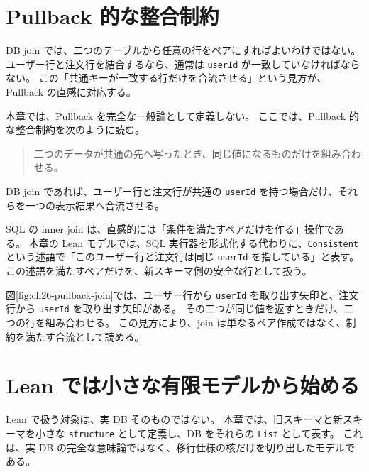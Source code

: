 \section{Pullback 的な整合制約}

DB join では、二つのテーブルから任意の行をペアにすればよいわけではない。
ユーザー行と注文行を結合するなら、通常は \texttt{userId} が一致していなければならない。
この「共通キーが一致する行だけを合流させる」という見方が、Pullback の直感に対応する。

\begin{definitionbox}
本章では、Pullback を完全な一般論として定義しない。
ここでは、Pullback 的な整合制約を次のように読む。
\begin{quote}
二つのデータが共通の先へ写ったとき、同じ値になるものだけを組み合わせる。
\end{quote}
DB join であれば、ユーザー行と注文行が共通の \texttt{userId} を持つ場合だけ、それらを一つの表示結果へ合流させる。
\end{definitionbox}

\begin{softwarebox}
SQL の inner join は、直感的には「条件を満たすペアだけを作る」操作である。
本章の Lean モデルでは、SQL 実行器を形式化する代わりに、\texttt{Consistent} という述語で「このユーザー行と注文行は同じ \texttt{userId} を指している」と表す。
この述語を満たすペアだけを、新スキーマ側の安全な行として扱う。
\end{softwarebox}


図\ref{fig:ch26-pullback-join}では、ユーザー行から \texttt{userId} を取り出す矢印と、注文行から \texttt{userId} を取り出す矢印がある。
その二つが同じ値を返すときだけ、二つの行を組み合わせる。
この見方により、join は単なるペア作成ではなく、制約を満たす合流として読める。

\section{Lean では小さな有限モデルから始める}

\begin{leanbox}
Lean で扱う対象は、実 DB そのものではない。
本章では、旧スキーマと新スキーマを小さな \texttt{structure} として定義し、DB をそれらの \texttt{List} として表す。
これは、実 DB の完全な意味論ではなく、移行仕様の核だけを切り出したモデルである。
\end{leanbox}

